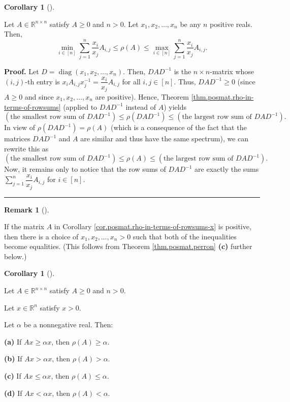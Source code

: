 \documentclass[numbers=enddot,12pt,final,onecolumn,notitlepage]{scrartcl}%
\numberwithin{exer}{subsection}
\theoremstyle{definition}
\newtheorem{remk}[theo]{Remark}
\newenvironment{remark}[1][]
{\begin{remk}[#1]\begin{leftbar}}
{\end{leftbar}\end{remk}}
\newtheorem{coro}[theo]{Corollary}
\newenvironment{corollary}[1][]
{\begin{coro}[#1]\begin{leftbar}}
{\end{leftbar}\end{coro}}
\newenvironment{proof}[1][Proof]{\noindent\textbf{#1.} }{\ \rule{0.5em}{0.5em}}
\let\sumnonlimits\sum
\renewcommand{\sum}{\sumnonlimits\limits}
\begin{document}
\begin{corollary}
\label{cor.posmat.rho-in-terms-of-rowsums-x}Let $A\in\mathbb{R}^{n\times n}$
satisfy $A\geq0$ and $n>0$. Let $x_{1},x_{2},\ldots,x_{n}$ be any $n$ positive
reals. Then,%
\[
\min\limits_{i\in\left[  n\right]  }\sum_{j=1}^{n}\dfrac{x_{i}}{x_{j}}%
A_{i,j}\leq\rho\left(  A\right)  \leq\max\limits_{i\in\left[  n\right]  }%
\sum_{j=1}^{n}\dfrac{x_{i}}{x_{j}}A_{i,j}.
\]

\end{corollary}

\begin{proof}
Let $D=\operatorname*{diag}\left(  x_{1},x_{2},\ldots,x_{n}\right)  $. Then,
$DAD^{-1}$ is the $n\times n$-matrix whose $\left(  i,j\right)  $-th entry is
$x_{i}A_{i,j}x_{j}^{-1}=\dfrac{x_{i}}{x_{j}}A_{i,j}$ for all $i,j\in\left[
n\right]  $. Thus, $DAD^{-1}\geq0$ (since $A\geq0$ and since $x_{1}%
,x_{2},\ldots,x_{n}$ are positive). Hence, Theorem
\ref{thm.posmat.rho-in-terms-of-rowsums} (applied to $DAD^{-1}$ instead of
$A$) yields%
\[
\left(  \text{the smallest row sum of }DAD^{-1}\right)  \leq\rho\left(
DAD^{-1}\right)  \leq\left(  \text{the largest row sum of }DAD^{-1}\right)  .
\]
In view of $\rho\left(  DAD^{-1}\right)  =\rho\left(  A\right)  $ (which is a
consequence of the fact that the matrices $DAD^{-1}$ and $A$ are similar and
thus have the same spectrum), we can rewrite this as
\[
\left(  \text{the smallest row sum of }DAD^{-1}\right)  \leq\rho\left(
A\right)  \leq\left(  \text{the largest row sum of }DAD^{-1}\right)  .
\]
Now, it remains only to notice that the row sums of $DAD^{-1}$ are exactly the
sums $\sum_{j=1}^{n}\dfrac{x_{i}}{x_{j}}A_{i,j}$ for $i\in\left[  n\right]  $.
\end{proof}

\begin{remark}
If the matrix $A$ in Corollary \ref{cor.posmat.rho-in-terms-of-rowsums-x} is
positive, then there is a choice of $x_{1},x_{2},\ldots,x_{n}>0$ such that
both of the inequalities become equalities. (This follows from Theorem
\ref{thm.posmat.perron} \textbf{(c)} further below.)
\end{remark}

\begin{corollary}
\label{cor.posmat.supereigenvectors}Let $A\in\mathbb{R}^{n\times n}$ satisfy
$A\geq0$ and $n>0$.

Let $x\in\mathbb{R}^{n}$ satisfy $x>0$.

Let $\alpha$ be a nonnegative real. Then: \medskip

\textbf{(a)} If $Ax\geq\alpha x$, then $\rho\left(  A\right)  \geq\alpha$.
\medskip

\textbf{(b)} If $Ax>\alpha x$, then $\rho\left(  A\right)  >\alpha$. \medskip

\textbf{(c)} If $Ax\leq\alpha x$, then $\rho\left(  A\right)  \leq\alpha$.
\medskip

\textbf{(d)} If $Ax<\alpha x$, then $\rho\left(  A\right)  <\alpha$.
\end{corollary}
\end{document}
